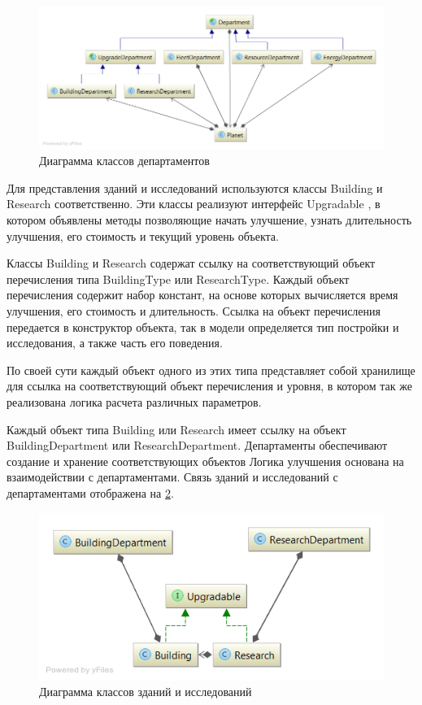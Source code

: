 \begin{figure}[H]
\centering
\includegraphics[scale=0.5]{diagram3.png}
\caption{Диаграмма классов  департаментов}
\label{pic:d1}
\end{figure}

Для представления зданий и исследований используются классы Building  и Research  соответственно. Эти классы реализуют интерфейс Upgradable , в котором объявлены методы позволяющие начать улучшение, узнать длительность улучшения, его стоимость и текущий уровень объекта.

Классы Building и Research содержат ссылку на соответствующий объект перечисления типа BuildingType   или
 ResearchType. Каждый объект перечисления содержит набор констант, на основе которых вычисляется время улучшения, его стоимость и длительность. Ссылка на объект перечисления передается в конструктор объекта, так в модели определяется тип постройки и исследования, а также часть его поведения.

По своей сути каждый объект одного из этих типа представляет собой хранилище для ссылка на соответствующий объект перечисления и уровня, в котором так же реализована логика расчета различных параметров. 

 Каждый объект типа Building или Research имеет ссылку на объект BuildingDepartment или ResearchDepartment. Департаменты обеспечивают создание и хранение соответствующих объектов Логика улучшения основана на взаимодействии с департаментами.
Связь зданий и исследований с департаментами отображена на \ref{pic:d4}.

\begin{figure}[H]
\centering
\includegraphics[scale=0.5]{diagram4.png}
\caption{Диаграмма классов зданий и исследований}
\label{pic:d4}
\end{figure}


